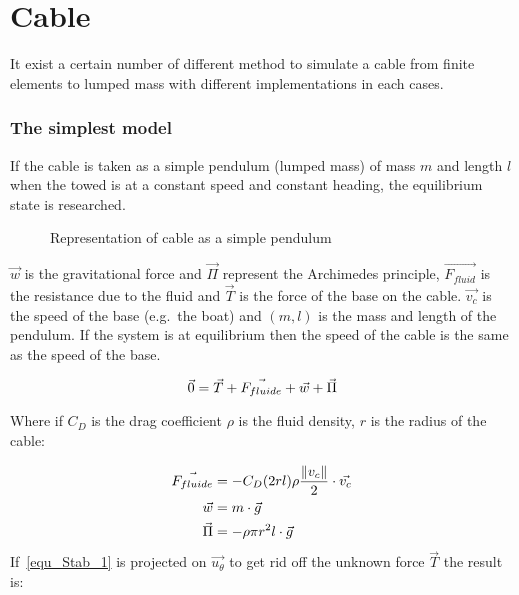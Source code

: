  \section{Cable}
 
 It exist a certain number of different method to simulate a cable from finite elements to lumped mass
 with different implementations in each cases.
 
\subsubsection*{The simplest model}

If the cable is taken as a simple pendulum (lumped mass) of mass $m$ and length $l$ when the towed is at a constant speed 
and constant heading, the equilibrium state is researched.


\begin{figure}[H]
\centering
{} %
{

}
\caption{Representation of cable as a simple pendulum}
\label{fig:model_pendulum}
\end{figure}


$\vec{w}$ is the gravitational force and $\vec{\Pi}$ represent the Archimedes principle, $\vec{F_{fluid}}$ is the resistance due to the fluid and $\vec{T}$ is the force of the base on the cable. $\vec{v_c}$ is the speed of the base (e.g.\ the boat) and $(m,l)$ is the mass and length of the pendulum. If the system is at equilibrium then the speed of the cable is the same as the speed of the base. 

\begin{equation}
 \vec{0} = \vec{T}+\vec{F_{fluide}}+\vec{w}+\vec{\Pi}\\
 \label{equ_Stab_1}
\end{equation}


Where if $C_D$ is the drag coefficient $\rho$ is the fluid density, $r$ is the radius of the cable:


{
\begin{align}
\centering
\vec{F_{fluide}} &= -C_D (2 r l) \rho \frac{ \|v_c\|}{2} \cdot \vec{v_c} \\
\vec{w} &= m \cdot \vec{g} \\
\vec{\Pi} &= - \rho \pi r^2 l \cdot \vec{g}
\end{align}
}
If~\ref{equ_Stab_1} is projected on $\vec{u_{\theta}}$ to get rid off the unknown force $\vec{T}$ the result is:

